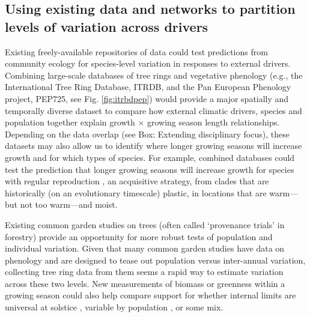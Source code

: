 \documentclass[11pt]{article}
\begin{document}
\subsection*{Using existing data and networks to partition levels of variation across drivers}

Existing freely-available repositories of data could test predictions from community ecology for species-level variation in responses to external drivers. Combining large-scale databases of tree rings and vegetative phenology (e.g., the International Tree Ring Database, ITRDB, and the Pan European Phenology project, PEP725, see Fig. \ref{fig:itrbdpep}) would provide a major spatially and temporally diverse dataset to compare how external climatic drivers, species and population together explain growth $\times$ growing season length relationships. Depending on the data overlap (see Box: Extending disciplinary focus), these datasets may also allow us to identify  where longer growing seasons will increase growth and for which types of species. For example, combined databases could test the prediction that longer growing seasons will increase growth for species with regular reproduction \citep[no masting, see also new masting database in][]{hacket2022mastree+}, an acquisitive strategy, from clades that are historically (on an evolutionary timescale) plastic, in locations that are warm---but not too warm---and moist. 

Existing common garden studies on trees (often called `provenance trials' in forestry) provide an opportunity for more robust tests of population and individual variation. Given that many common garden studies have data on phenology \citep{aitken2016} and are designed to tease out population versus inter-annual variation, collecting tree ring data from them seems a rapid way to estimate variation across these two levels. %
New measurements of biomass or greenness within a growing season could also help compare support for whether internal limits are universal at solstice \citep{zohner2023effect}, variable by population \citep{soolanayakanahally2013timing}, or some mix.  %
\end{document}
